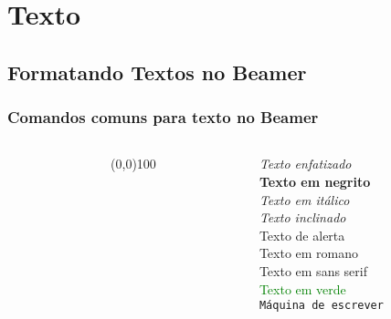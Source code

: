 \section{Texto}
\subsection{Formatando Textos no Beamer}

\begin{frame}
  \frametitle{Comandos comuns para texto no Beamer}

  \begin{block}{}
      \begin{columns}
        \begin{column}[l]{5cm}
          \inputminted[fontsize=\small]{tex}{codes/06-text_commands.tex}
        \end{column}

        \begin{column}[c]{0cm}
          \line(0,0){100}
        \end{column}

        \begin{column}[r]{4cm}
          {\small
          \emph{Texto enfatizado}   \\
          \textbf{Texto em negrito} \\
          \textit{Texto em itálico} \\
          \textsl{Texto inclinado} \\
          \alert{Texto de alerta}  \\
          \textrm{Texto em romano} \\
          \textsf{Texto em sans serif} \\
          \textcolor{green}{Texto em verde} \\
          \texttt{Máquina de escrever} \\
          }
        \end{column}
      \end{columns}
  \end{block}

\end{frame}


